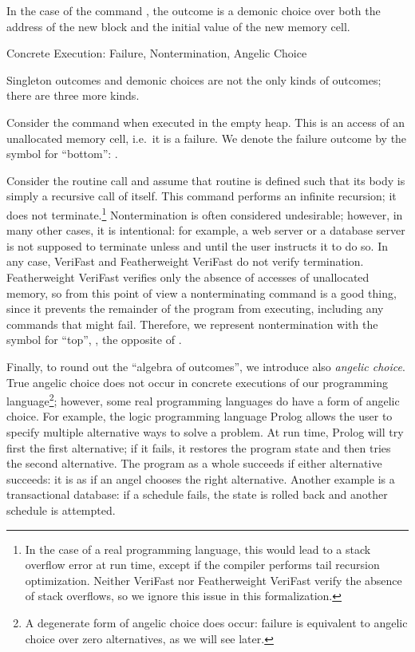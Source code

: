 \documentclass{CSML}
\theoremstyle{definition}\newtheorem{notation}[thm]{Notation}
\theoremstyle{plain}\newtheorem{satz}[thm]{Satz}
\begin{document}
In the case of the command , 
the outcome is a demonic choice over both the address of the 
new block and the initial value of the new memory cell. 

\begin{exa}{Concrete Execution: Failure, Nontermination, Angelic Choice}



\end{exa}

Singleton outcomes and demonic choices are not the only kinds 
of outcomes; there are three more kinds.

Consider the command  when executed in the empty 
heap. This is an access of an unallocated memory cell, i.e.~it 
is a failure. We denote the failure outcome by the symbol for 
``bottom'': . 

Consider the routine call  and assume that 
routine  is defined such that its body is 
simply a recursive call of itself. This command performs an 
infinite recursion; it does not terminate.\footnote{In the case 
of a real programming language, this would lead to a stack 
overflow error at run time, except if the compiler performs 
tail recursion optimization. Neither VeriFast nor Featherweight 
VeriFast verify the absence of stack overflows, so we ignore 
this issue in this formalization.} Nontermination is often 
considered undesirable; however, in many other cases, it is 
intentional: for example, a web server or a database server is 
not supposed to terminate unless and until the user instructs 
it to do so. In any case, VeriFast and Featherweight VeriFast 
do not verify termination. Featherweight VeriFast verifies only 
the absence of accesses of unallocated memory, so from this 
point of view a nonterminating command is a good thing, since 
it prevents the remainder of the program from executing, 
including any commands that might fail. Therefore, we represent 
nontermination with the symbol for ``top'', , the 
opposite of .

Finally, to round out the ``algebra of outcomes'', we 
introduce also \emph{angelic choice}. True angelic choice does 
not occur in concrete executions of our programming 
language\footnote{A degenerate form of angelic choice does 
occur: failure is equivalent to angelic choice over zero 
alternatives, as we will see later.}; however, some real 
programming languages do have a form of angelic choice. For 
example, the logic programming language Prolog allows the user 
to specify multiple alternative ways to solve a problem. At run 
time, Prolog will try first the first alternative; if it fails, 
it restores the program state and then tries the second 
alternative. The program as a whole succeeds if either 
alternative succeeds: it is as if an angel chooses the right 
alternative. Another example is a transactional database: if a 
schedule fails, the state is rolled back and another schedule 
is attempted.
\end{document}

